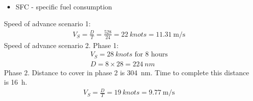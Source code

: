 \begin{itemize}
    \item SFC - specific fuel consumption
\end{itemize}
Speed of advance scenario 1:
\begin{gather}
    V_S = \frac{D}{T} = \frac{528}{24} = \SI{22}{knots} = \SI{11.31}{\meter\per\second}
\end{gather}
Speed of advance scenario 2. Phase 1:
\begin{gather}
    V_S = \SI{28}{knots} \textrm{ for 8 hours}\\
    D = 8\times 28 = \SI{224}{nm}
\end{gather}
Phase 2. Distance to cover in phase 2 is \SI{304}{nm}. Time to complete this distance is \SI{16}{\hour}.
\begin{gather}
    V_S = \frac{D}{T} = \SI{19}{knots} = \SI{9.77}{\meter\per\second}
\end{gather}
